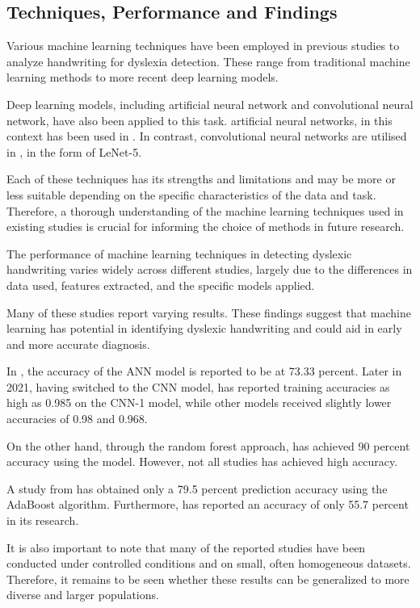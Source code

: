 \newpage
\subsection{Techniques, Performance and Findings}
Various machine learning techniques have been employed in previous studies to analyze handwriting for dyslexia detection. These range from traditional machine learning methods to more recent deep learning models.

Deep learning models, including artificial neural network and convolutional neural network, have also been applied to this task. artificial neural networks, in this context has been used in \textcite{isa2019automated}. In contrast, convolutional neural networks are utilised in \textcite{Isa2021CNNCM}, in the form of LeNet-5.

Each of these techniques has its strengths and limitations and may be more or less suitable depending on the specific characteristics of the data and task. Therefore, a thorough understanding of the machine learning techniques used in existing studies is crucial for informing the choice of methods in future research.

The performance of machine learning techniques in detecting dyslexic handwriting varies widely across different studies, largely due to the differences in data used, features extracted, and the specific models applied.

Many of these studies report varying results. These findings suggest that machine learning has potential in identifying dyslexic handwriting and could aid in early and more accurate diagnosis.

In \textcite{Isa2019AutomatedDO}, the accuracy of the ANN model is reported to be at 73.33 percent. Later in 2021, having switched to the CNN model, \textcite{Isa2021CNNCM} has reported training accuracies as high as 0.985 on the CNN-1 model, while other models received slightly lower accuracies of 0.98 and 0.968. 

On the other hand, through the random forest approach, \textcite{Richard2020DyslexiaAD} has achieved 90 percent accuracy using the model. However, not all studies has achieved high accuracy. 

A study from \textcite{Drotr2020DysgraphiaDT} has obtained only a 79.5 percent prediction accuracy using the AdaBoost algorithm. Furthermore, \textcite{Spoon2019TowardsDD} has reported an accuracy of only 55.7 percent in its research.

It is also important to note that many of the reported studies have been conducted under controlled conditions and on small, often homogeneous datasets. Therefore, it remains to be seen whether these results can be generalized to more diverse and larger populations.

